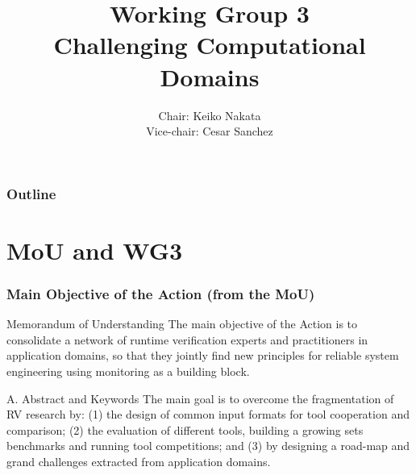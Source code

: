 \documentclass{beamer}
\title[WG3]{Working Group 3\\
{\bf Challenging Computational Domains}}
\author{Chair: Keiko Nakata\\ Vice-chair: Cesar Sanchez}
\begin{document}
\begin{frame}
  \titlepage
\end{frame}

\begin{frame}
  \frametitle{Outline}
  \tableofcontents  
\end{frame}

\section{MoU and WG3}

\begin{frame}
  \frametitle{Main Objective of the Action (from the MoU)}

  \begin{block}{Memorandum of Understanding}
    The main objective of the Action is to consolidate a network of
    runtime verification experts and practitioners in application
    domains, so that they jointly find new principles for reliable
    system engineering using monitoring as a building block.
  \end{block}
  
  \pause
  \vspace{2em}

  \begin{block}{A. Abstract and Keywords}
  The main goal is to overcome the fragmentation of RV research by:
  (1) the design of common input formats for tool cooperation and
    comparison;
  (2) the evaluation of different tools, building a growing sets
    benchmarks and running tool competitions; and
  (3) \alert{by designing a road-map and grand challenges extracted from
    application domains.}
\end{block}

\end{frame}
\end{document}
